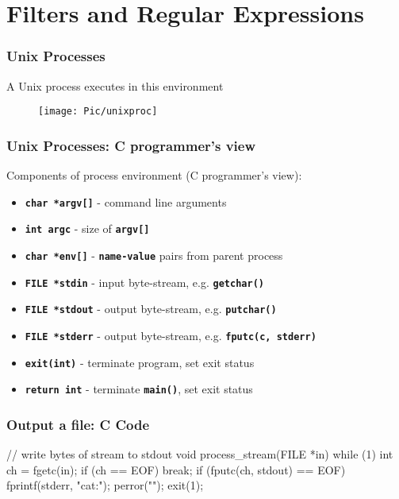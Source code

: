 

\section{Filters and Regular Expressions}
\begin{frame}
\frametitle{Unix Processes}
A Unix process executes in this environment

	\begin{figure}
    	\centering
    	\texttt{[image: Pic/unixproc]}
  	\end{figure}
\end{frame}

\begin{frame}
\frametitle{Unix Processes: C programmer's view}
Components of process environment {\small (C programmer's view)}:
\begin{itemize}
\item  \textbf{\tt{char *argv[]}} - command line arguments
\item  \textbf{\tt{int argc}} - size of \textbf{\tt{argv[]}}
\item  \textbf{\tt{char *env[]}} - \textbf{\tt{name-value}} pairs from parent process
\item  \textbf{\tt{FILE *stdin}} - input byte-stream, e.g. \textbf{\tt{getchar()}}
\item  \textbf{\tt{FILE *stdout}} - output byte-stream, e.g. \textbf{\tt{putchar()}}
\item  \textbf{\tt{FILE *stderr}} - output byte-stream, e.g. \textbf{\tt{fputc(c, stderr)}}
\item  \textbf{\tt{exit(int)}} - terminate program, set exit status 
\item  \textbf{\tt{return int}} - terminate \textbf{\tt{main()}}, set exit status
\end{itemize}
\end{frame}


\begin{frame}[fragile]
\frametitle{Output a file: C Code}
\begin{C}
// write bytes of stream to stdout
void process_stream(FILE *in) {
    while (1) {
        int ch = fgetc(in);
        if (ch == EOF)
             break;
        if (fputc(ch, stdout) == EOF) {
            fprintf(stderr, "cat:");
            perror("");
            exit(1);
        }
    }
}
\end{C}
\end{frame}

